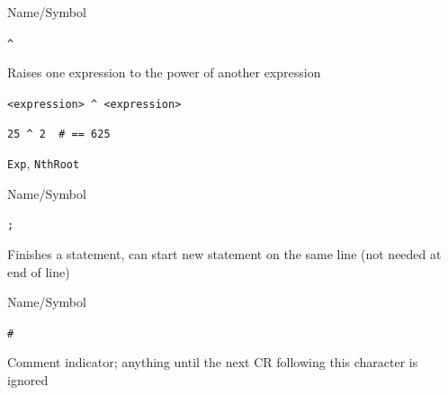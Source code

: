 \begin{desc}{Name/Symbol}

\item[Name/Symbol] \verb!^!

\item[Description]  Raises one expression to the power of  another expression

\item[Usage]       \verb!<expression> ^ <expression>!

\item[Example]
\begin{verbatim}
25 ^ 2  # == 625
\end{verbatim}

\item[See Also]    \texttt{Exp}, \texttt{NthRoot}

\end{desc}



\begin{desc}{Name/Symbol}

\item[Name/Symbol] \verb+;+ 

\item[Description]        Finishes a statement, can start new statement
                      on the same line (not needed at end of line)

\item[Usage]       

\item[Example]     

\item[See Also]

\end{desc}



\begin{desc}{Name/Symbol}     

\item[Name/Symbol] \verb!#!

\item[Description]   Comment indicator; anything until the next CR
	       following this character is ignored

\item[Usage]       

\item[Example]     

\item[See Also]

\end{desc} 



